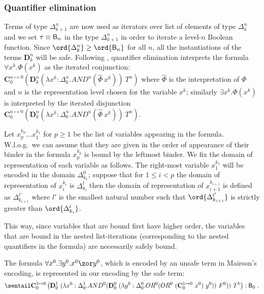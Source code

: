 \subsubsection{Quantifier elimination}
Terms of type $\Delta_{k+1}^n$ are now used as iterators over list of elements of type $\Delta_k^n$ and we set $\tau \equiv \mathsf{B}_n$ in the type $\Delta_{k+1}^n$ in order to iterate a level-$n$ Boolean function. Since $\ord{\Delta_k^n} \geq \ord{\booltype_n}$ for all $n$, all the instantiations of the terms $\mathbf{D}_k^n$ will be safe. Following \cite{mairson1992spt}, quantifier elimination interprets the formula $\forall x^k.\Phi(x^k)$ as the iterated conjunction:
$\mathbf{C}_0^{n\mapsto 0} \left( \mathbf{D}_k^n(\lambda x^k:\Delta_k^n.AND^n(\hat\Phi~x^k))~T^n \right)$ where $\hat\Phi$ is the interpretation of $\Phi$
and $n$ is the representation level chosen for the variable $x^k$; similarly $\exists x^k.\Phi(x^k)$  is interpreted by the iterated disjunction $\mathbf{C}_0^{n\mapsto 0} \left( \mathbf{D}_k^n(\lambda x^k:\Delta_k^n.AND^n(\hat\Phi~x^k))~T^n\right)$.

Let $x^{k_p}_p \ldots x^{k_1}_1$ for $p\geq1$ be the list of variables appearing in the formula. W.l.o.g.\ we can assume that they are given in the order of appearance of their binder in the formula \ie $x^{k_p}_p$ is bound by the leftmost binder. We fix the domain of representation of each variable as follows. The right-most variable $x^{k_1}_1$ will be encoded in the domain $\Delta^0_{k_1}$; suppose that for $1\leq i< p$ the domain of representation of $x^{k_i}_i$ is $\Delta^l_{k_l}$ then the domain of representation of $x^{k_{i+1}}_{i+1}$ is defined as
$\Delta^{l'}_{k_{i+1}}$ where $l'$ is the smallest natural number such that $\ord{\Delta^{l'}_{k_{i+1}}}$ is strictly greater than $\ord{\Delta^{l}_{k_i}}$.

This way, since variables that are bound first have higher order, the variables that are bound in the nested list-iterations (corresponding to the nested quantifiers in the formula) are necessarily safely bound.

\begin{example}
The formula  $\forall x^0 . \exists y^0 . x^0 \zor y^0$, which is
encoded by an unsafe term in Mairson's encoding, is represented in
our encoding by the safe term:
 $$\sentail \mathbf{C}_0^{1\mapsto 0} \left( \mathbf{D}_0^1~(\lambda x^0:\Delta_0^1. AND^0 ( \mathbf{D}_0^0 ~(\lambda y^0:\Delta_0^0. OR^0 (OR^0~(\mathbf{C}_0^{1\mapsto 0}~x^0)~y^0))~F^0))~T^1 \right) : \booltype_0 \ .$$
\end{example}


